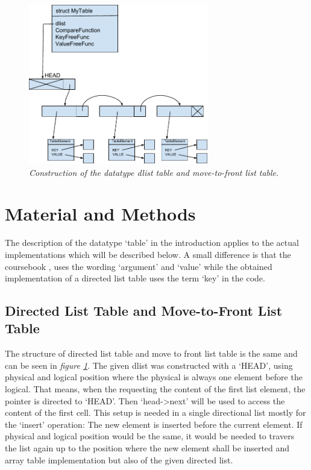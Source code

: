 \documentclass[a4paper,11pt,twoside]{article}
\begin{document}
\begin{figure}[H]
\centering
\includegraphics[width=0.7\textwidth]{figures/dlisttable.pdf}
\caption{\textit{Construction of the datatype dlist table and
    move-to-front list table.}}
\label{fig:dlisttable}
\end{figure}


\section{Material and Methods}
The description of the datatype `table' in the introduction applies to
the actual implementations which will be described below. A small
difference is that the coursebook \cite{janlert2000}, uses the wording
`argument' and `value' while the obtained implementation of a directed
list table uses the term `key' in the code.  
\subsection{Directed List Table and Move-to-Front List Table}
The structure of directed list table and move to front list table is
the same and can be seen in \textit{figure \ref{fig:dlisttable}}. The given
dlist was constructed with a `HEAD', using physical and logical
position where the physical is always one element before the logical. 
That means, when the requesting the content of the first
list element, the pointer is directed to `HEAD'. Then `head->next'
will be used to access the content of the first cell. This setup is
needed in a single directional list mostly for the `insert' operation:
The new element is inserted before the current element. If physical
and logical position would be the same, it would be needed to travers
the list again up to the position where the new element shall be inserted
and array table implementation but also of the given directed list.
\end{document}
